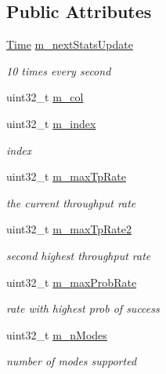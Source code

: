 \subsection*{Public Attributes}
\begin{DoxyCompactItemize}
\item 
\hyperlink{classns3_1_1Time}{Time} \hyperlink{structns3_1_1MinstrelWifiRemoteStation_a39b3f9b67725127612483b1df852e5e8}{m\+\_\+next\+Stats\+Update}
\begin{DoxyCompactList}\small\item\em 10 times every second \end{DoxyCompactList}\item 
uint32\+\_\+t \hyperlink{structns3_1_1MinstrelWifiRemoteStation_a6c5d9084964d9d7d2ea2f4b5aa9d0112}{m\+\_\+col}
\item 
uint32\+\_\+t \hyperlink{structns3_1_1MinstrelWifiRemoteStation_afd90dbb3743a793ad63bd9cfab6ecce5}{m\+\_\+index}
\begin{DoxyCompactList}\small\item\em index \end{DoxyCompactList}\item 
uint32\+\_\+t \hyperlink{structns3_1_1MinstrelWifiRemoteStation_aee7f3d4355ae3b93e92b571786186bce}{m\+\_\+max\+Tp\+Rate}
\begin{DoxyCompactList}\small\item\em the current throughput rate \end{DoxyCompactList}\item 
uint32\+\_\+t \hyperlink{structns3_1_1MinstrelWifiRemoteStation_a2fc005b37f4b1ed2442b06288cc19aff}{m\+\_\+max\+Tp\+Rate2}
\begin{DoxyCompactList}\small\item\em second highest throughput rate \end{DoxyCompactList}\item 
uint32\+\_\+t \hyperlink{structns3_1_1MinstrelWifiRemoteStation_a77ab2136ac37d866eee59325508a19d3}{m\+\_\+max\+Prob\+Rate}
\begin{DoxyCompactList}\small\item\em rate with highest prob of success \end{DoxyCompactList}\item 
uint32\+\_\+t \hyperlink{structns3_1_1MinstrelWifiRemoteStation_af1bbcaea8a95b3bb2aba494b0f568598}{m\+\_\+n\+Modes}
\begin{DoxyCompactList}\small\item\em number of modes supported \end{DoxyCompactList}\item 

\end{DoxyCompactItemize}
